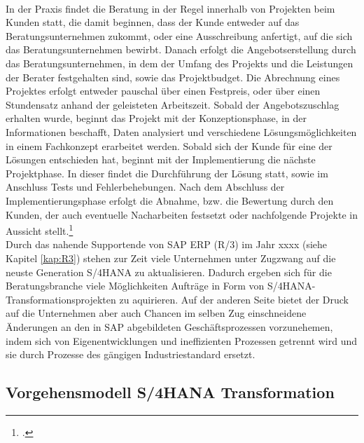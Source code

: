 \\In der Praxis findet die Beratung in der Regel innerhalb von Projekten beim Kunden statt, die damit beginnen, dass der Kunde entweder auf das Beratungsunternehmen zukommt, oder eine Ausschreibung anfertigt, auf die sich das Beratungsunternehmen bewirbt. Danach erfolgt die Angebotserstellung durch das Beratungsunternehmen, in dem der Umfang des Projekts und die Leistungen der Berater festgehalten sind, sowie das Projektbudget. Die Abrechnung eines Projektes erfolgt entweder pauschal über einen Festpreis, oder über einen Stundensatz anhand der geleisteten Arbeitszeit. Sobald der Angebotszuschlag erhalten wurde, beginnt das Projekt mit der Konzeptionsphase, in der Informationen beschafft, Daten analysiert und verschiedene Lösungsmöglichkeiten in einem Fachkonzept erarbeitet werden. Sobald sich der Kunde für eine der Lösungen entschieden hat, beginnt mit der Implementierung die nächste Projektphase. In dieser findet die Durchführung der Lösung statt, sowie im Anschluss Tests und Fehlerbehebungen. Nach dem Abschluss der Implementierungsphase erfolgt die Abnahme, bzw. die Bewertung durch den Kunden, der auch eventuelle Nacharbeiten festsetzt oder nachfolgende Projekte in Aussicht stellt.\footcite[Vgl.][]{gabler-beratung}
\\Durch das nahende Supportende von SAP ERP (R/3) im Jahr xxxx (siehe Kapitel \ref{kap:R3}) stehen zur Zeit viele Unternehmen unter Zugzwang auf die neuste Generation S/4HANA zu aktualisieren. Dadurch ergeben sich für die Beratungsbranche viele Möglichkeiten Aufträge in Form von S/4HANA-Transformationsprojekten zu aquirieren. Auf der anderen Seite bietet der Druck auf die Unternehmen aber auch Chancen im selben Zug einschneidene Änderungen an den in SAP abgebildeten Geschäftsprozessen vorzunehemen, indem sich von Eigenentwicklungen und ineffizienten Prozessen getrennt wird und sie durch Prozesse des gängigen Industriestandard ersetzt.

\subsection{Vorgehensmodell S/4HANA Transformation}
